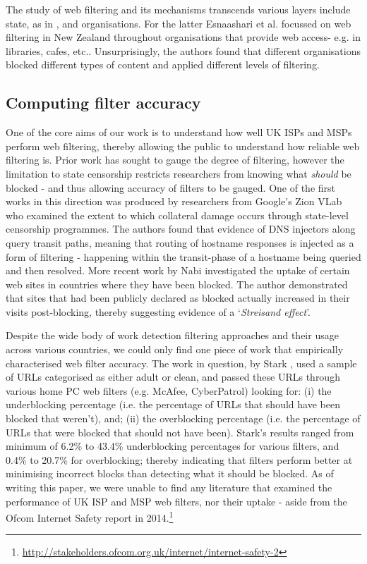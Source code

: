 \documentclass{bmcart}
\begin{document}
The study of web filtering and its mechanisms transcends various layers include state, as in \cite{verkamp2012inferring, dalek2013method, crete2013not, aceto2015monitoring}, and organisations.
For the latter Esnaashari et al. \cite{esnaashari2014restrictions} focussed on web filtering in New Zealand throughout organisations that provide web access- e.g. in libraries, cafes, etc..
Unsurprisingly, the authors found that different organisations blocked different types of content and applied different levels of filtering.

\subsection*{Computing filter accuracy}
One of the core aims of our work is to understand how well UK ISPs and MSPs perform web filtering, thereby allowing the public to understand how reliable web filtering is.
Prior work has sought to gauge the degree of filtering, however the limitation to state censorship restricts researchers from knowing what \textit{should} be blocked - and thus allowing accuracy of filters to be gauged.
One of the first works in this direction was produced by researchers from Google's Zion VLab \cite{Anonymous:2012:CDI:2317307.2317311} who examined the extent to which collateral damage occurs through state-level censorship programmes.
The authors found that evidence of DNS injectors along query transit paths, meaning that routing of hostname responses is injected as a form of filtering - happening within the transit-phase of a hostname being queried and then resolved.
More recent work by Nabi \cite{nabi2014censorship} investigated the uptake of certain web sites in countries where they have been blocked.
The author demonstrated that sites that had been publicly declared as blocked actually increased in their visits post-blocking, thereby suggesting evidence of a `\textit{Streisand effect}'.

Despite the wide body of work detection filtering approaches and their usage across various countries, we could only find one piece of work that empirically characterised web filter accuracy.
The work in question, by Stark \cite{stark2007effectiveness}, used a sample of URLs categorised as either adult or clean, and passed these URLs through various home PC web filters (e.g. McAfee, CyberPatrol) looking for: (i) the underblocking percentage (i.e. the percentage of URLs that should have been blocked that weren't), and; (ii) the overblocking percentage (i.e. the percentage of URLs that were blocked that should not have been).
Stark's results ranged from minimum of 6.2\% to 43.4\% underblocking percentages for various filters, and 0.4\% to 20.7\% for overblocking; thereby indicating that filters perform better at minimising incorrect blocks than detecting what it should be blocked.
As of writing this paper, we were unable to find any literature that examined the performance of UK ISP and MSP web filters, nor their uptake - aside from the Ofcom Internet Safety report in 2014.\footnote{\url{http://stakeholders.ofcom.org.uk/internet/internet-safety-2}}
\end{document}
